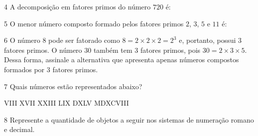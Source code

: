 {\num{4} A decomposição em fatores primos do número $720$ é:


\num{5}  O menor número composto formado pelos fatores primos $2$, $3$, $5$ e $11$ é:


\num{6}  O número $8$ pode ser fatorado como $8 = 2\times 2\times 2 = 2^3$ e, portanto,
possui $3$ fatores primos. O número $30$ também tem $3$ fatores primos, pois
$30 = 2\times 3\times 5$. Dessa forma, assinale a alternativa que apresenta apenas
números compostos formados por $3$ fatores primos.


\num{7}  Quais números estão representados abaixo?

\begin{mdframed}[linewidth=2pt,linecolor=azul!20,backgroundcolor=azul!20,roundcorner=2pt]
VIII \hfill XVII \hfill XXIII \hfill LIX \hfill DXLV \hfill MDXCVIII
\end{mdframed}



\num{8}  Represente a quantidade de objetos a seguir nos sistemas de numeração
romano e decimal.

\begin{escolha}
\item {}
\item {}
\item {}
\end{escolha}




}

